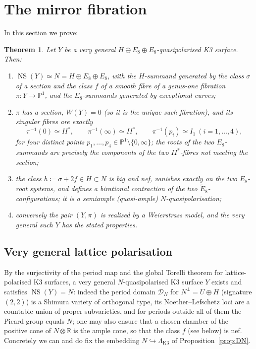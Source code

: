 \documentclass[11pt]{article}
\newtheorem{theorem}{Theorem}[section]
\newcommand{\PP}{\mathbb{P}}
\newcommand{\bR}{\mathbb{R}}
\DeclareMathOperator{\NS}{NS}
\begin{document}
\section{The mirror fibration}\label{sec:fibration}

In this section we prove:

\begin{theorem}\label{thm:fibration}
Let $Y$ be a very general $H\oplus E_8\oplus E_8$-quasipolarised K3 surface.
Then:
\begin{enumerate}[label=(\alph*),leftmargin=2em]
\item $\NS(Y)\simeq N=H\oplus E_8\oplus E_8$, with the $H$-summand generated
by the class $\sigma$ of a section and the class $f$ of a smooth fibre of a
genus-one fibration $\pi\colon Y\to\PP^1$, and the $E_8$-summands generated
by exceptional curves;
\item $\pi$ has a section, $W(Y)=0$ (so it is the unique such fibration), and
its singular fibres are exactly
\[
\pi^{-1}(0)\simeq II^*,\qquad
\pi^{-1}(\infty)\simeq II^*,\qquad
\pi^{-1}(p_i)\simeq I_1\ (i=1,\dots,4),
\]
for four distinct points $p_1,\dots,p_4\in\PP^1\setminus\{0,\infty\}$;
the roots of the two $E_8$-summands are precisely the components of the two
$II^*$-fibres not meeting the section;
\item the class $h\coloneqq\sigma+2f\in H\subset N$ is big and nef, vanishes
exactly on the two $E_8$-root systems, and defines a birational contraction
of the two $\tilde E_8$-configurations; it is a semiample (quasi-ample)
$N$-quasipolarisation;
\item conversely the pair $(Y,\pi)$ is realised by a Weierstrass model, and
the very general such $Y$ has the stated properties.
\end{enumerate}
\end{theorem}

\subsection{Very general lattice polarisation}

By the surjectivity of the period map and the global Torelli theorem for
lattice-polarised K3 surfaces, a very general $N$-quasipolarised K3 surface
$Y$ exists and satisfies $\NS(Y)=N$: indeed the period domain
$\mathcal D_N$ for $N^{\perp}=U\oplus H$ (signature $(2,2)$) is a Shimura
variety of orthogonal type, its Noether--Lefschetz loci are a countable
union of proper subvarieties, and for periods outside all of them the
Picard group equals $N$; one may also ensure that a chosen chamber of the
positive cone of $N\otimes\bR$ is the ample cone, so that the class $f$ (see
below) is nef. Concretely we can and do fix the embedding
$N\hookrightarrow\Lambda_{\mathrm{K3}}$ of Proposition~\ref{prop:DN}.
\end{document}
